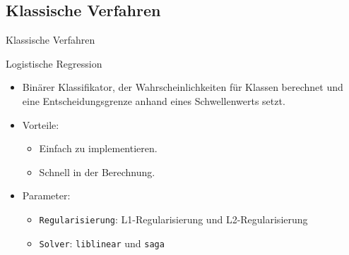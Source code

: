 \documentclass[aspectratio=169]{beamer} %
\begin{document}
\subsection{Klassische Verfahren}

\begin{frame}{Klassische Verfahren}
    \begin{block}{Logistische Regression}
        \begin{itemize}
            \item Binärer Klassifikator, der Wahrscheinlichkeiten für Klassen berechnet und eine Entscheidungsgrenze anhand eines Schwellenwerts setzt.
            \item Vorteile:
                  \begin{itemize}
                      \item Einfach zu implementieren.
                      \item Schnell in der Berechnung.
                  \end{itemize}
            \item Parameter:
                  \begin{itemize}
                      \item \texttt{Regularisierung}: L1-Regularisierung und L2-Regularisierung
                      \item \texttt{Solver}: \texttt{liblinear} und \texttt{saga}
                  \end{itemize}
        \end{itemize}
    \end{block}
\end{frame}
\end{document}
